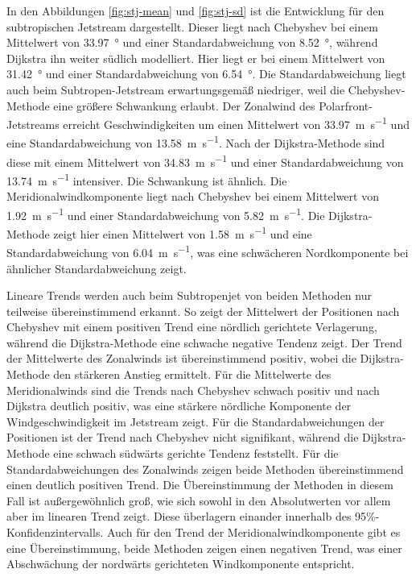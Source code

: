In den Abbildungen \ref{fig:stj-mean} und \ref{fig:stj-sd} ist die Entwicklung für den subtropischen Jetstream dargestellt. Dieser liegt nach Chebyshev bei einem Mittelwert von \SI{33.97}{\degree} und einer Standardabweichung von \SI{8.52}{\degree}, während Dijkstra ihn weiter südlich modelliert. Hier liegt er bei einem Mittelwert von \SI{31.42}{\degree} und einer Standardabweichung von \SI{6.54}{\degree}. Die Standardabweichung liegt auch beim Subtropen-Jetstream erwartungsgemäß niedriger, weil die Chebyshev-Methode eine größere Schwankung erlaubt. Der Zonalwind des Polarfront-Jetstreams erreicht Geschwindigkeiten um einen Mittelwert von \SI{33.97}{\metre\per\second} und eine Standardabweichung von \SI{13.58}{\metre\per\second}. Nach der Dijkstra-Methode sind diese mit einem Mittelwert von \SI{34.83}{\metre\per\second} und einer Standardabweichung von \SI{13.74}{\metre\per\second} intensiver. Die Schwankung ist ähnlich. Die Meridionalwindkomponente liegt nach Chebyshev bei einem Mittelwert von \SI{1.92}{\metre\per\second} und einer Standardabweichung von \SI{5.82}{\metre\per\second}. Die Dijkstra-Methode zeigt hier einen Mittelwert von \SI{1.58}{\metre\per\second} und eine Standardabweichung von \SI{6.04}{\metre\per\second}, was eine schwächeren Nordkomponente bei ähnlicher Standardabweichung zeigt.

Lineare Trends werden auch beim Subtropenjet von beiden Methoden nur teilweise übereinstimmend erkannt. So zeigt der Mittelwert der Positionen nach Chebyshev mit einem positiven Trend eine nördlich gerichtete Verlagerung, während die Dijkstra-Methode eine schwache negative Tendenz zeigt. Der Trend der Mittelwerte des Zonalwinds ist übereinstimmend positiv, wobei die Dijkstra-Methode den stärkeren Anstieg ermittelt. Für die Mittelwerte des Meridionalwinds sind die Trends nach Chebyshev schwach positiv und nach Dijkstra deutlich positiv, was eine stärkere nördliche Komponente der Windgeschwindigkeit im Jetstream zeigt. Für die Standardabweichungen der Positionen ist der Trend nach Chebyshev nicht signifikant, während die Dijkstra-Methode eine schwach südwärts gerichte Tendenz feststellt. Für die Standardabweichungen des Zonalwinds zeigen beide Methoden übereinstimmend einen deutlich positiven Trend. Die Übereinstimmung der Methoden in diesem Fall ist außergewöhnlich groß, wie sich sowohl in den Absolutwerten vor allem aber im linearen Trend zeigt. Diese überlagern einander innerhalb des 95\%-Konfidenzintervalls. Auch für den Trend der Meridionalwindkomponente gibt es eine Übereinstimmung, beide Methoden zeigen einen negativen Trend, was einer Abschwächung der nordwärts gerichteten Windkomponente entspricht.


